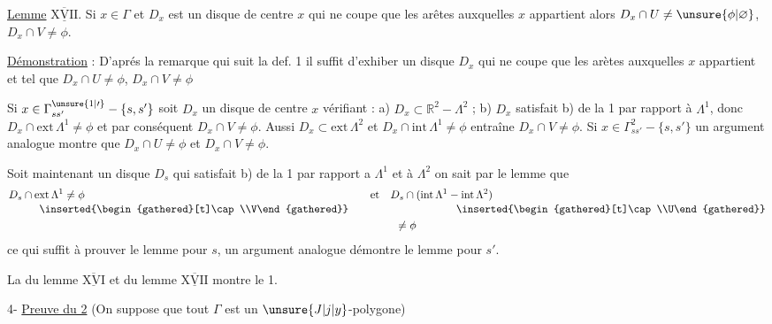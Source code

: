 \uline{Lemme} $\underline{\overline{\mathrm{XVII}}}$. Si $x\in\Gamma$ et $D_x$ est un disque de centre $x$ qui ne coupe que les arêtes auxquelles $x$ appartient alors $D_x\cap U\ne\unsure{\phi|\varnothing}$, $D_x\cap V\ne\phi$.

\uline{Démonstration} : D'aprés la remarque qui suit la def. 1 il suffit d'exhiber un disque $D_x$ qui ne coupe que les arètes auxquelles $x$ appartient et tel que $D_x\cap U\ne\phi$, $D_x\cap V\ne\phi$

Si $x\in\Gamma^{\unsure{1|\prime}}_{ss'}-\{s,s'\}$ soit $D_x$ un disque de centre $x$ vérifiant : a) $D_x\subset\mathbb{R}^{2}-\Lambda^{2}$ ; b) $D_x$ satisfait b) de la  1 par rapport à $\Lambda^{1}$, donc $D_x\cap\mathrm{ext}\,\Lambda^{1}\ne\phi$ et par conséquent $D_x\cap V\ne\phi$. Aussi $D_x\subset\mathrm{ext}\,\Lambda^{2}$ et $D_x\cap\mathrm{int}\,\Lambda^{1}\ne\phi$ entraîne $D_x\cap V\ne\phi$. Si $x\in\Gamma^{2}_{ss'}-\{s,s'\}$ un argument analogue montre que $D_x\cap U\ne\phi$ et $D_x\cap V\ne\phi$.

Soit maintenant un disque $D_s$ qui satisfait b) de la  1 par rapport a $\Lambda^{1}$ et à $\Lambda^{2}$ on sait par le lemme  que
\[
\begin{aligned}
D_s\cap{}&\mathrm{ext}\,\Lambda^{1}\ne\phi
  &\quad\text{et}\quad D_s\cap{}&(\mathrm{int}\,\Lambda^{1}-\mathrm{int}\,\Lambda^{2})\\[-.5ex]
 &\hphantom{\mathrm{e}}\inserted{\begin{gathered}[t]\cap\\V\end{gathered}}
  &\begin{gathered}[t]\vphantom{\cap}\\\ne\phi\end{gathered}
  &\hphantom{(\mathrm{int}\,\Lambda^{1}-}\inserted{\begin{gathered}[t]\cap\\U\end{gathered}}
\end{aligned}
\]
ce qui suffit à prouver le lemme pour $s$, un argument analogue démontre le lemme pour $s'$.

La  du lemme $\underline{\overline{\mathrm{XVI}}}$ et du lemme $\underline{\overline{\mathrm{XVII}}}$ montre le  1.

4- \uline{Preuve du  2} (On suppose que tout  $\Gamma$ est un $\unsure{J|j|y}$-polygone)

